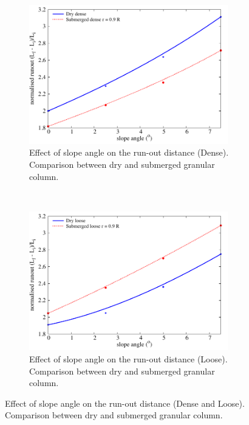 \begin{figure}
	\centering
\begin{subfigure}[b]{0.95\textwidth}
	\centering
    \includegraphics[width=0.95\textwidth]{slope_runout_dense}
    \caption{Effect of slope angle on the run-out distance (Dense). Comparison 
    between dry and submerged granular column.}
    \label{fig:slope_runout_dense}
\end{subfigure}\\
\begin{subfigure}[b]{0.95\textwidth}
	\centering
    \includegraphics[width=0.95\textwidth]{slope_runout_loose}
    \caption{Effect of slope angle on the run-out distance (Loose). Comparison 
    between dry and submerged granular column.}
    \label{fig:slope_runout_loose}
\end{subfigure}
\caption{Effect of slope angle on the run-out distance (Dense and Loose). 
	Comparison between dry and submerged granular column.}
\label{fig:slope_loose_dense}
\end{figure}


